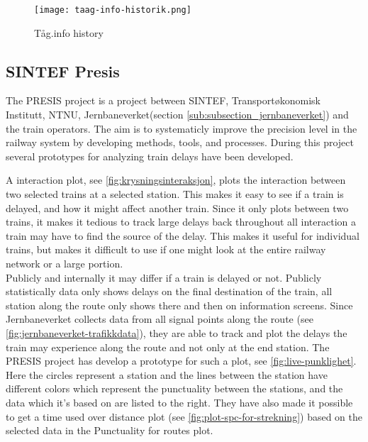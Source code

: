 \begin{figure}[!htbp]
	\texttt{[image: taag-info-historik.png]}
	\caption[Tåg.info history]{Tåg.info history
	\cite{taagInfo}}
	\label{fig:taag-info-historik}
\end{figure}
\pagebreak


\clearpage
\subsection{SINTEF Presis}
\label{sub:subsection_sintefPresis}

The PRESIS\cite{sintefPresis} project is a project between SINTEF\cite{sintef},
Transportøkonomisk Institutt\cite{transportOkonomiskInstitutt},
NTNU\cite{ntnu}, Jernbaneverket(section \vref{sub:subsection_jernbaneverket}) 
and the train operators. The aim is to systematicly improve the precision 
level in the railway system by developing methods, tools, and processes. During
this project several prototypes for analyzing train delays have been developed.

A interaction plot, see \vref{fig:krysningsinteraksjon}, plots the interaction
between two selected trains at a selected station. This makes it easy to see 
if a train is delayed, and how it might affect another train. Since it only
plots between two trains, it makes it tedious to track large delays back 
throughout all interaction a train may have to find the source of the delay.
This makes it useful for individual trains, but makes it difficult to use if
one might look at the entire railway network or a large portion. \\

Publicly and internally it may differ if a train is delayed or not. Publicly
statistically data only shows delays on the final destination of the train, all
station along the route only shows there and then on information screens.
Since Jernbaneverket collects data from all signal points along the route (see \vref{fig:jernbaneverket-trafikkdata}), they
are able to track and plot the delays the train may experience along the route
and not only at the end station. The PRESIS project has develop a prototype for
such a plot, see \vref{fig:live-punklighet}. Here the circles represent a
station and the lines between the station have different 
colors which represent the punctuality between the stations, and the data which
it's based on are listed to the right. They have also made it possible to get a
time used over distance plot (see \vref{fig:plot-spc-for-strekning}) based on
the selected data in the Punctuality for routes plot. 

